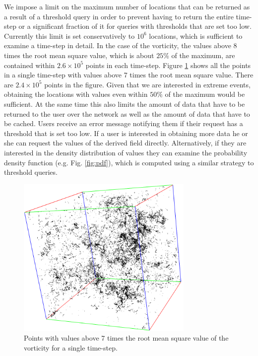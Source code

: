 \documentclass{sig-alternate}
\begin{document}
We impose a limit on the maximum number of locations that can be returned as a result of a threshold query in order to prevent having to return
the entire time-step or a significant fraction of it for queries with thresholds that are set too low. Currently this limit is set conservatively to $10^6$ locations, 
which is sufficient to examine a time-step in detail. In the case of the vorticity, the values above 8 times the root mean square value, 
which is about $25\%$ of the maximum, are contained within $2.6\times10^5$ points in each time-step. Figure \ref{fig:points_7rms} shows all the points 
in a single time-step with values above 7 times the root mean square value. There are $2.4\times10^5$ points in the figure.
Given that we are interested in extreme events, obtaining the locations with values even within $50\%$ of the maximum would be sufficient. 
At the same time this also limits the amount of data that have to be returned to the user over the network as well as the amount of
data that have to be cached. Users receive an error message notifying them if their request has a threshold that is set too low. If a user
is interested in obtaining more data he or she can request the values of the derived field directly. Alternatively, if they are interested in the density distribution
of values they can examine the probability density function (e.g. Fig. \ref{fig:pdf}), which is computed using a similar strategy to threshold queries.

\begin{figure}
\centering
\includegraphics[width=3.35in]{Figures/points_7rms.png}
\caption{Points with values above 7 times the root mean square value of the vorticity for a single time-step.}
\label{fig:points_7rms}
\end{figure}
\end{document}
